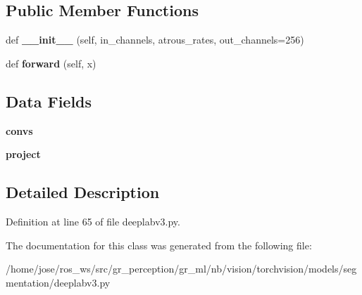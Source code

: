 \subsection*{Public Member Functions}
\begin{DoxyCompactItemize}
\item 
\mbox{\label{classtorchvision_1_1models_1_1segmentation_1_1deeplabv3_1_1ASPP_aac480fc9b934b64c94087ff9607b66b9}} 
def {\bfseries \+\_\+\+\_\+init\+\_\+\+\_\+} (self, in\+\_\+channels, atrous\+\_\+rates, out\+\_\+channels=256)
\item 
\mbox{\label{classtorchvision_1_1models_1_1segmentation_1_1deeplabv3_1_1ASPP_a7579b0ff151fc4b1b25aa3a55acc8f25}} 
def {\bfseries forward} (self, x)
\end{DoxyCompactItemize}
\subsection*{Data Fields}
\begin{DoxyCompactItemize}
\item 
\mbox{\label{classtorchvision_1_1models_1_1segmentation_1_1deeplabv3_1_1ASPP_a9857bb28022bb8f5687b6400c0a1ea65}} 
{\bfseries convs}
\item 
\mbox{\label{classtorchvision_1_1models_1_1segmentation_1_1deeplabv3_1_1ASPP_ab020c2e0fbbf79e9b4d2c9cc1ee1189b}} 
{\bfseries project}
\end{DoxyCompactItemize}


\subsection{Detailed Description}


Definition at line 65 of file deeplabv3.\+py.



The documentation for this class was generated from the following file\+:\begin{DoxyCompactItemize}
\item 
/home/jose/ros\+\_\+ws/src/gr\+\_\+perception/gr\+\_\+ml/nb/vision/torchvision/models/segmentation/deeplabv3.\+py\end{DoxyCompactItemize}
